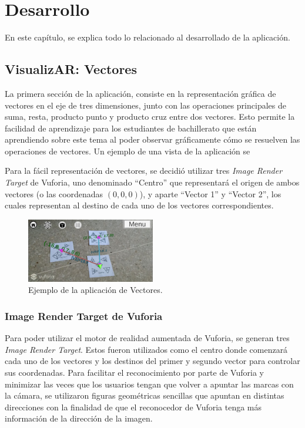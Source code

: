 \chapter{Desarrollo}
En este capítulo, se explica todo lo relacionado al desarrollado de la aplicación.

\section{VisualizAR: Vectores}
La primera sección de la aplicación, consiste en la representación gráfica de vectores en el eje de tres dimensiones, junto con las operaciones principales de suma, resta, producto punto y producto cruz entre dos vectores. Esto permite la facilidad de aprendizaje para los estudiantes de bachillerato que están aprendiendo sobre este tema al poder observar gráficamente cómo se resuelven las operaciones de vectores. Un ejemplo de una vista de la aplicación se

Para la fácil representación de vectores, se decidió utilizar tres \textit{Image Render Target} de Vuforia, uno denominado “Centro” que representará el origen de ambos vectores (o las coordenadas $(0,0,0)$), y aparte “Vector 1” y “Vector 2”, los cuales representan al destino de cada uno de los vectores correspondientes.

\begin{figure}[hbt!]
\centering
\includegraphics[width=0.5\textwidth]{figuras/vectores/Vectores1.png}
\caption{\label{fig:vec_ej1}Ejemplo de la aplicación de Vectores.}
\end{figure}
\FloatBarrier

\subsection{Image Render Target de Vuforia}
Para poder utilizar el motor de realidad aumentada de Vuforia, se generan tres \textit{Image Render Target}. Estos fueron utilizados como el centro donde comenzará cada uno de los vectores y los destinos del primer y segundo vector para controlar sus coordenadas. Para facilitar el reconocimiento por parte de Vuforia y minimizar las veces que los usuarios tengan que volver a apuntar las marcas con la cámara, se utilizaron figuras geométricas sencillas que apuntan en distintas direcciones con la finalidad de que el reconocedor de Vuforia tenga más información de la dirección de la imagen. 


